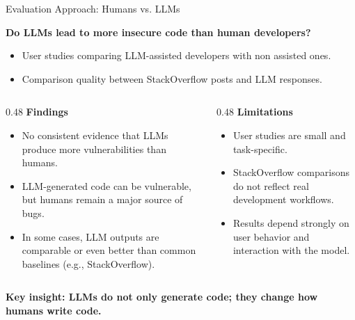 \begin{frame}{Evaluation Approach: Humans vs. LLMs}

    \textbf{Do LLMs lead to more insecure code than human developers?}
    \begin{itemize}
        \small
        \item User studies comparing LLM-assisted developers with non assisted ones. \cite{user_study_perry_2023, user_study_sandoval_2023}
        \item Comparison quality between StackOverflow posts and LLM responses. \cite{so_firouzi_2024, so_hamer_2024}
    \end{itemize}
    
    \medskip
    
    \begin{columns}[T]
    \begin{column}{0.48\textwidth}
    \textbf{Findings}
    \begin{itemize}
        \item No consistent evidence that LLMs produce more vulnerabilities than humans.
        \item LLM-generated code can be vulnerable, but humans remain a major source of bugs.
        \item In some cases, LLM outputs are comparable or even better than common baselines (e.g., StackOverflow).
    \end{itemize}
    \end{column}
    
    \begin{column}{0.48\textwidth}
    \textbf{Limitations}
    \begin{itemize}
        \item User studies are small and task-specific.
        \item StackOverflow comparisons do not reflect real development workflows.
        \item Results depend strongly on user behavior and interaction with the model.
    \end{itemize}
    \end{column}
    \end{columns}
    
    \bigskip
    \centering
    \textbf{Key insight: LLMs do not only generate code; they change how humans write code.}

\end{frame}


